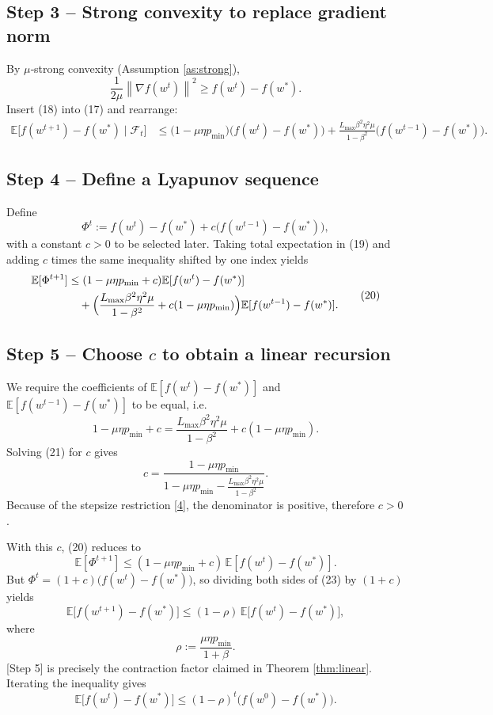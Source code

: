 \documentclass{article}
\newcommand{\E}{\mathbb{E}}
\newcommand{\norm}[1]{\left\|#1\right\|}
\newcommand{\grad}[1]{\nabla #1}
\begin{document}
\subsection*{Step 3 – Strong convexity to replace gradient norm}
By $\mu$‑strong convexity (Assumption \ref{as:strong}),
\[
\frac{1}{2\mu}\norm{\grad f(w^{t})}^{2}\ge f(w^{t})-f(w^{*}). \tag{18}
\]
Insert (18) into (17) and rearrange:
\[
\begin{aligned}
    \E\!\bigl[f(w^{t+1})-f(w^{*})\mid\mathcal{F}_{t}\bigr]
    &\le \bigl(1-\mu\eta p_{\min}\bigr)\bigl(f(w^{t})-f(w^{*})\bigr)
        +\frac{L_{\max}\beta^{2}\eta^{2}\mu}{1-\beta^{2}}\bigl(f(w^{t-1})-f(w^{*})\bigr).
\end{aligned}
\tag{19}
\]

\subsection*{Step 4 – Define a Lyapunov sequence}
Define
\[
    \Phi^{t}:=f(w^{t})-f(w^{*})+c\bigl(f(w^{t-1})-f(w^{*})\bigr),
\]
with a constant $c>0$ to be selected later. Taking total expectation in (19) and adding $c$ times the same inequality shifted by one index yields
\[
\begin{aligned}
    \E[\Phi^{t+1}]
    &\le (1-\mu\eta p_{\min}+c)\E[f(w^{t})-f(w^{*})] \\
    &\quad +\Bigl(\frac{L_{\max}\beta^{2}\eta^{2}\mu}{1-\beta^{2}}+c(1-\mu\eta p_{\min})\Bigr)\E[f(w^{t-1})-f(w^{*})] .
\end{aligned}
\tag{20}
\]

\subsection*{Step 5 – Choose $c$ to obtain a linear recursion}
We require the coefficients of $\E[f(w^{t})-f(w^{*})]$ and $\E[f(w^{t-1})-f(w^{*})]$ to be equal, i.e.
\[
1-\mu\eta p_{\min}+c
    =\frac{L_{\max}\beta^{2}\eta^{2}\mu}{1-\beta^{2}}+c(1-\mu\eta p_{\min}) . \tag{21}
\]
Solving (21) for $c$ gives
\[
c=\frac{1-\mu\eta p_{\min}}{1-\mu\eta p_{\min}-\frac{L_{\max}\beta^{2}\eta^{2}\mu}{1-\beta^{2}}}. \tag{22}
\]
Because of the stepsize restriction \eqref{4}, the denominator is positive, therefore $c>0$.

With this $c$, (20) reduces to
\[
\E[\Phi^{t+1}] \le (1-\mu\eta p_{\min}+c)\,\E[f(w^{t})-f(w^{*})] . \tag{23}
\]
But $\Phi^{t}= (1+c)\bigl(f(w^{t})-f(w^{*})\bigr)$, so dividing both sides of (23) by $(1+c)$ yields
\[
\E\!\bigl[f(w^{t+1})-f(w^{*})\bigr]\le (1-\rho)\,\E\!\bigl[f(w^{t})-f(w^{*})\bigr],
\]
where
\[
\rho:=\frac{\mu\eta p_{\min}}{1+\beta}. \tag{24}
\]
[Step 5] is precisely the contraction factor claimed in Theorem \ref{thm:linear}. Iterating the inequality gives
\[
\E\!\bigl[f(w^{t})-f(w^{*})\bigr]\le (1-\rho)^{t}\bigl(f(w^{0})-f(w^{*})\bigr). \tag{25}
\]
\end{document}
